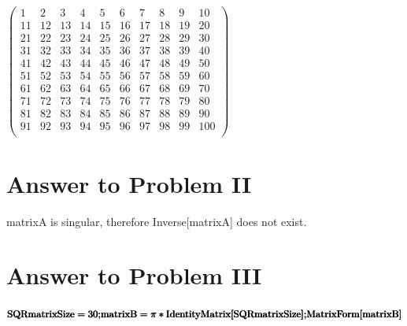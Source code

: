 \documentclass[11pt,a4paper]{article}
\begin{document}
\begin{doublespace}
\noindent\(\left(
\begin{array}{cccccccccc}
 1 & 2 & 3 & 4 & 5 & 6 & 7 & 8 & 9 & 10 \\
 11 & 12 & 13 & 14 & 15 & 16 & 17 & 18 & 19 & 20 \\
 21 & 22 & 23 & 24 & 25 & 26 & 27 & 28 & 29 & 30 \\
 31 & 32 & 33 & 34 & 35 & 36 & 37 & 38 & 39 & 40 \\
 41 & 42 & 43 & 44 & 45 & 46 & 47 & 48 & 49 & 50 \\
 51 & 52 & 53 & 54 & 55 & 56 & 57 & 58 & 59 & 60 \\
 61 & 62 & 63 & 64 & 65 & 66 & 67 & 68 & 69 & 70 \\
 71 & 72 & 73 & 74 & 75 & 76 & 77 & 78 & 79 & 80 \\
 81 & 82 & 83 & 84 & 85 & 86 & 87 & 88 & 89 & 90 \\
 91 & 92 & 93 & 94 & 95 & 96 & 97 & 98 & 99 & 100 \\
\end{array}
\right)\)
\end{doublespace}

\clearpage
\section{Answer to Problem II}\label{sec:P02}

matrixA is singular, therefore Inverse[matrixA] does not exist.

\clearpage
\section{Answer to Problem III}\label{sec:P03}

\begin{doublespace}
\noindent\(\pmb{\text{SQRmatrixSize}=30;}\\
\pmb{\text{matrixB}=\pi *\text{IdentityMatrix}[\text{SQRmatrixSize}];}\\
\pmb{\text{MatrixForm}[\text{matrixB}]}\)
\end{doublespace}
\end{document}
